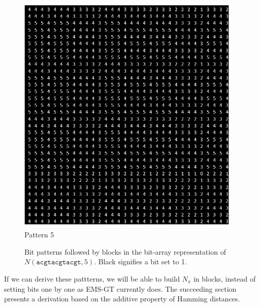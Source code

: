 \documentclass[oneside,12pt]{DISCSthesis}
\begin{document}
{\begin{figure}[h]
			\begin{minipage}{.135\textwidth}\centering\includegraphics[width=0.95\textwidth]{img/5}\\ Pattern 5 \end{minipage}
			\newline\newline
			\caption[Block bit patterns in an $l$-mer neighborhood]{Bit patterns followed by blocks in the bit-array representation of $N(\texttt{acgtacgtacgt}, 5)$. 
			Black signifies a bit set to 1.}
			\end{figure}

		\noindent If we can derive these pattterns, we will be able to build $N_x$ in blocks, instead of setting bits one by one as EMS-GT currently does. The succeeding section presents a derivation based on the additive property of Hamming distances.
		\newpage

}
\end{document}
